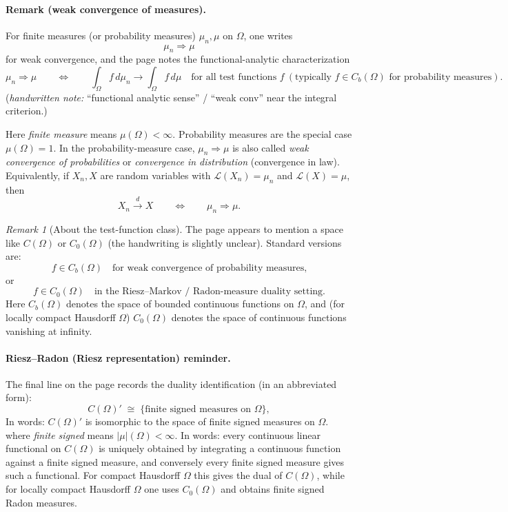 \documentclass[11pt]{article}
\theoremstyle{definition}
\theoremstyle{remark}
\newtheorem{remark}{Remark}
\begin{document}
\paragraph{Remark (weak convergence of measures).}
For finite measures (or probability measures) $\mu_n,\mu$ on $\Omega$, one writes
\[
\mu_n \Rightarrow \mu
\]
for weak convergence, and the page notes the functional-analytic characterization
\[
\mu_n \Rightarrow \mu
\qquad\Longleftrightarrow\qquad
\int_\Omega f\,d\mu_n \to \int_\Omega f\,d\mu
\quad \text{for all test functions } f \ (\text{typically } f\in C_b(\Omega)\text{ for probability measures}).
\]
\noindent
(\emph{handwritten note:} ``functional analytic sense'' / ``weak conv'' near the integral criterion.)
\smallskip

\noindent
Here \emph{finite measure} means $\mu(\Omega)<\infty$. Probability measures are the special case $\mu(\Omega)=1$.
\noindent
In the probability-measure case, $\mu_n\Rightarrow \mu$ is also called \emph{weak convergence of probabilities} or \emph{convergence in distribution} (convergence in law).
Equivalently, if $X_n,X$ are random variables with $\mathcal{L}(X_n)=\mu_n$ and $\mathcal{L}(X)=\mu$, then
\[
X_n \xrightarrow{d} X \qquad\Longleftrightarrow\qquad \mu_n \Rightarrow \mu.
\]

\begin{remark}[About the test-function class]
The page appears to mention a space like $C(\Omega)$ or $C_0(\Omega)$ (the handwriting is slightly unclear). Standard versions are:
\[
f\in C_b(\Omega)
\quad\text{for weak convergence of probability measures,}
\]
or
\[
f\in C_0(\Omega)
\quad\text{in the Riesz--Markov / Radon-measure duality setting.}
\]
\noindent
Here $C_b(\Omega)$ denotes the space of bounded continuous functions on $\Omega$, and (for locally compact Hausdorff $\Omega$) $C_0(\Omega)$ denotes the space of continuous functions vanishing at infinity.
\end{remark}

\paragraph{Riesz--Radon (Riesz representation) reminder.}
The final line on the page records the duality identification (in an abbreviated form):
\[
C(\Omega)' \;\cong\; \{\text{finite signed measures on }\Omega\},
\]
In words: $C(\Omega)'$ is isomorphic to the space of finite signed measures on $\Omega$.
where \emph{finite signed} means $|\mu|(\Omega)<\infty$. In words: every continuous linear functional on $C(\Omega)$ is uniquely obtained by integrating a continuous function against a finite signed measure, and conversely every finite signed measure gives such a functional. For compact Hausdorff $\Omega$ this gives the dual of $C(\Omega)$, while for locally compact Hausdorff $\Omega$ one uses $C_0(\Omega)$ and obtains finite signed Radon measures.
\end{document}

